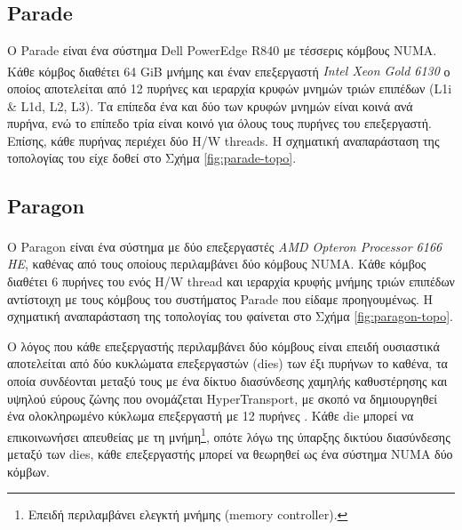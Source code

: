 \subsection{Parade}
Ο Parade είναι ένα σύστημα Dell PowerEdge R840 με τέσσερις κόμβους NUMA. Κάθε κόμβος διαθέτει 64 GiB μνήμης και έναν επεξεργαστή \textit{Intel\textsuperscript{\textregistered} Xeon\textsuperscript{\textregistered} Gold 6130} ο οποίος αποτελείται από 12 πυρήνες και ιεραρχία κρυφών μνημών τριών επιπέδων (L1i \& L1d, L2, L3). Τα επίπεδα ένα και δύο των κρυφών μνημών είναι κοινά ανά πυρήνα, ενώ το επίπεδο τρία είναι κοινό για όλους τους πυρήνες του επεξεργαστή. Επίσης, κάθε πυρήνας περιέχει δύο H/W threads. Η σχηματική αναπαράσταση της τοπολογίας του είχε δοθεί στο Σχήμα \ref{fig:parade-topo}.

\subsection{Paragon}
Ο Paragon είναι ένα σύστημα με δύο επεξεργαστές \textit{AMD Opteron\textsuperscript{\texttrademark} Processor 6166 HE}, καθένας από τους οποίους περιλαμβάνει δύο κόμβους NUMA. Κάθε κόμβος διαθέτει 6 πυρήνες του ενός H/W thread και ιεραρχία κρυφής μνήμης τριών επιπέδων αντίστοιχη με τους κόμβους του συστήματος Parade που είδαμε προηγουμένως. Η σχηματική αναπαράσταση της τοπολογίας του φαίνεται στο Σχήμα \ref{fig:paragon-topo}.

Ο λόγος που κάθε επεξεργαστής περιλαμβάνει δύο κόμβους είναι επειδή ουσιαστικά αποτελείται από δύο κυκλώματα επεξεργαστών (dies) των έξι πυρήνων το καθένα, τα οποία συνδέονται μεταξύ τους με ένα δίκτυο διασύνδεσης χαμηλής καθυστέρησης και υψηλού εύρους ζώνης που ονομάζεται HyperTransport, με σκοπό να δημιουργηθεί ένα ολοκληρωμένο κύκλωμα επεξεργαστή με 12 πυρήνες \cite{conway2010cache}. Κάθε die μπορεί να επικοινωνήσει απευθείας με τη μνήμη\footnote{Επειδή περιλαμβάνει ελεγκτή μνήμης (memory controller).}, οπότε λόγω της ύπαρξης δικτύου διασύνδεσης μεταξύ των dies, κάθε επεξεργαστής μπορεί να θεωρηθεί ως ένα σύστημα NUMA δύο κόμβων.


